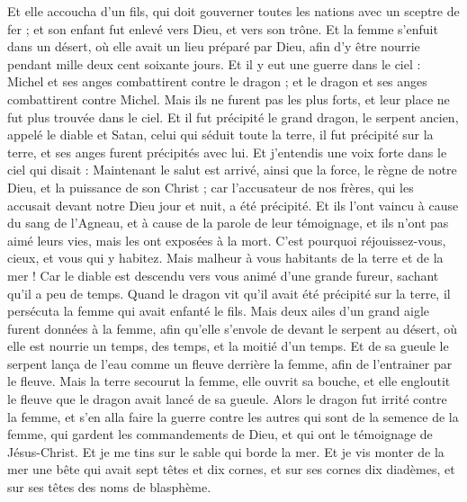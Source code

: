 \begin{multicols}{2}
Et elle accoucha d'un fils, qui doit gouverner toutes les nations avec un sceptre de fer{} ; et son enfant fut enlevé vers Dieu, et vers son trône{}.
Et la femme s'enfuit dans un désert, où elle avait un lieu préparé par Dieu, afin d’y être nourrie pendant mille deux cent soixante jours.
Et il y eut une guerre dans le ciel : Michel et ses anges combattirent contre le dragon ; et le dragon et ses anges combattirent contre Michel.
Mais ils ne furent pas les plus forts, et leur place ne fut plus trouvée dans le ciel.
Et il fut précipité le grand dragon, le serpent ancien, appelé le diable et Satan, celui qui séduit toute la terre, il fut précipité sur la terre, et ses anges furent précipités avec lui{}.
Et j’entendis une voix forte dans le ciel qui disait : Maintenant le salut est arrivé, ainsi que la force, le règne de notre Dieu, et la puissance de son Christ ; car l'accusateur de nos frères, qui les accusait devant notre Dieu jour et nuit, a été précipité.
Et ils l'ont vaincu à cause du sang de l'Agneau, et à cause de la parole de leur témoignage, et ils n'ont pas aimé leurs vies, mais les ont exposées à la mort.
C'est pourquoi réjouissez-vous, cieux, et vous qui y habitez. Mais malheur à vous habitants de la terre et de la mer ! Car le diable est descendu vers vous animé d’une grande fureur, sachant qu'il a peu de temps.
Quand le dragon vit qu'il avait été précipité sur la terre, il persécuta la femme qui avait enfanté le fils.
Mais deux ailes d'un grand aigle furent données à la femme, afin qu'elle s'envole de devant le serpent au désert, où elle est nourrie un temps, des temps, et la moitié d'un temps.
Et de sa gueule le serpent lança de l'eau comme un fleuve derrière la femme, afin de l’entrainer par le fleuve.
Mais la terre secourut la femme, elle ouvrit sa bouche, et elle engloutit le fleuve que le dragon avait lancé de sa gueule.
Alors le dragon fut irrité contre la femme, et s'en alla faire la guerre contre les autres qui sont de la semence de la femme, qui gardent les commandements de Dieu, et qui ont le témoignage de Jésus-Christ.
Et je me tins sur le sable qui borde la mer.
\VerseOne{}Et je vis monter de la mer une bête{} qui avait sept têtes et dix cornes, et sur ses cornes dix diadèmes, et sur ses têtes des noms de blasphème.

\end{multicols}
